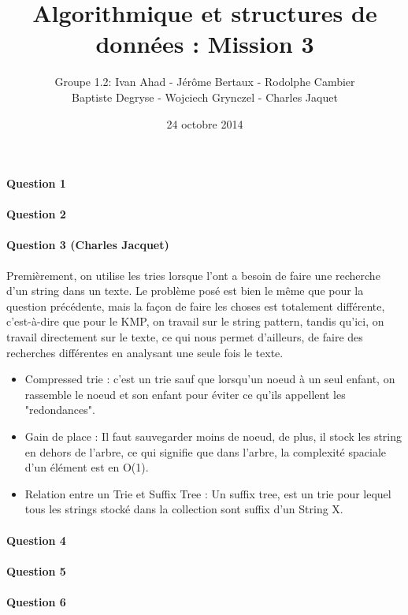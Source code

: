 \documentclass[a4paper]{article}
\title{Algorithmique et structures de données : Mission 3}
\date{24 octobre 2014}
\author{Groupe 1.2: Ivan Ahad - Jérôme Bertaux - Rodolphe Cambier \\ 
	Baptiste Degryse - Wojciech Grynczel - Charles Jaquet}
\begin{document}
\maketitle

\paragraph*{Question 1}
\paragraph*{Question 2}
\paragraph*{Question 3 (Charles Jacquet)} 

Premièrement, on utilise les tries lorsque l'ont a besoin de faire une recherche d'un string dans un texte. Le problème posé est bien le même que pour la question précédente, mais la façon de faire les choses est totalement différente, c'est-à-dire que pour le KMP, on travail sur le string pattern, tandis qu'ici, on travail directement sur le texte, ce qui nous permet d'ailleurs, de faire des recherches différentes en analysant une seule fois le texte.
\begin{itemize}
\item {Compressed trie} : c'est un trie sauf que lorsqu'un noeud à un seul enfant, on rassemble le noeud et son enfant pour éviter ce qu'ils appellent les "redondances".
\item {Gain de place} : Il faut sauvegarder moins de noeud, de plus, il stock les string en dehors de l'arbre, ce qui signifie que dans l'arbre, la complexité spaciale d'un élément est en O(1).
\item {Relation entre un Trie et Suffix Tree} : Un suffix tree, est un trie pour lequel tous les strings stocké dans la collection sont suffix d'un String X.
\end{itemize}
\paragraph*{Question 4}
\paragraph*{Question 5}
\paragraph*{Question 6}
\end{document}
